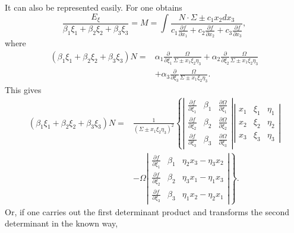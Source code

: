\documentclass[10pt]{article}
\begin{document}
It can also be represented easily. For one obtains
\[
\frac{E_\xi}{\beta_1\xi_1+\beta_2\xi_2+\beta_3\xi_3}
=M=\int\frac{N\cdot\Sigma\pm c_1x_2dx_3}{c_1\frac{\partial f}{\partial x_1}+c_2\frac{\partial f}{\partial x_2}+c_3\frac{\partial f}{\partial x_3}},
\]
where
\[
\begin{aligned}
(\beta_1\xi_1+\beta_2\xi_2+\beta_3\xi_3)N
={}&\alpha_1\frac{\partial}{\partial \xi_1}\frac{\Omega}{\Sigma\pm x_1\xi_2\eta_3}
+\alpha_2\frac{\partial}{\partial \xi_2}\frac{\Omega}{\Sigma\pm x_1\xi_2\eta_3}\\
&+\alpha_3\frac{\partial}{\partial \xi_3}\frac{\Omega}{\Sigma\pm x_1\xi_2\eta_3}.
\end{aligned}
\]
This gives
\[
\begin{aligned}
(\beta_1\xi_1+\beta_2\xi_2+\beta_3\xi_3)N
={}&\frac{1}{(\Sigma\pm x_1\xi_2\eta_3)^2}
\left\{
\left|\begin{array}{ccc}
\frac{\partial f}{\partial \xi_1}&\beta_1&\frac{\partial\Omega}{\partial \xi_1}\\
\frac{\partial f}{\partial \xi_2}&\beta_2&\frac{\partial\Omega}{\partial \xi_2}\\
\frac{\partial f}{\partial \xi_3}&\beta_3&\frac{\partial\Omega}{\partial \xi_3}
\end{array}\right|
\left|\begin{array}{ccc}
x_1&\xi_1&\eta_1\\
x_2&\xi_2&\eta_2\\
x_3&\xi_3&\eta_3
\end{array}\right|
\right.\\
&\left.
-\Omega
\left|\begin{array}{ccc}
\frac{\partial f}{\partial \xi_1}&\beta_1&\eta_2x_3-\eta_3x_2\\
\frac{\partial f}{\partial \xi_2}&\beta_2&\eta_3x_1-\eta_1x_3\\
\frac{\partial f}{\partial \xi_3}&\beta_3&\eta_1x_2-\eta_2x_1
\end{array}\right|
\right\}.
\end{aligned}
\]
Or, if one carries out the first determinant product and transforms the second determinant in the known way,
\end{document}
